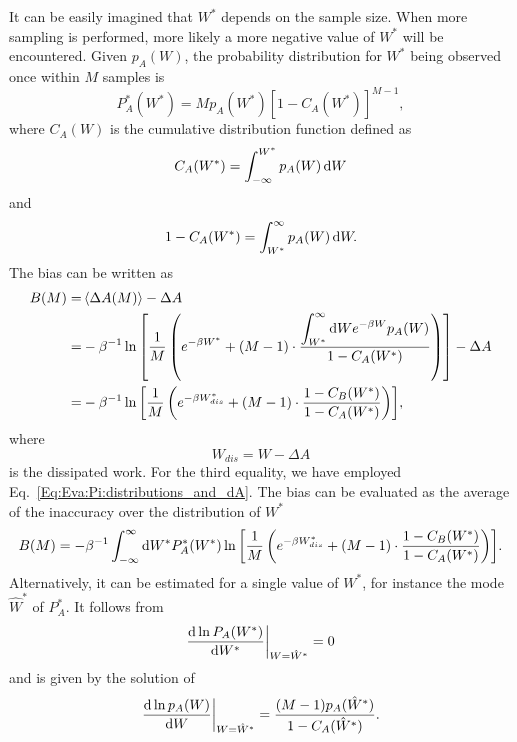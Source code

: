 It can be easily imagined that $W^\ast$ depends on the sample size. When more sampling is performed, more likely a more negative value of $W^\ast$ will be encountered. Given $p_A(W)$, the probability distribution for $W^\ast$ being observed once within $M$ samples is
\begin{equation}
    P_A^\ast(W^\ast)=Mp_A(W^\ast)[1-C_A(W^\ast)]^{M-1},
    \label{Eq:Eva:Pi:prob_of_Wstar}
\end{equation}
where $C_A(W)$ is the cumulative distribution function defined as
\begin{equation}
    C_A(W^\ast)=\int_{-\infty}^{W^\ast} p_A(W)\mathop{}\!\mathrm{d} W
\end{equation}
and
\begin{equation}
    1-C_A(W^\ast)=\int_{W^\ast}^{\infty} p_A(W)\mathop{}\!\mathrm{d} W.
\end{equation}
The bias can be written as
\begin{align}
    B(M)=&\left<\Delta A(M)\right>-\Delta A\notag\\
        =&-\beta^{-1}\ln{\left[\frac{1}{M}\left(e^{-\beta W^\ast}+(M-1)\cdot \frac{\displaystyle\int_{W^\ast}^{\infty}\mathop{}\!\mathrm{d}We^{-\beta W}p_A(W)}{1-C_A(W^\ast)}\right)\right]}-
        \Delta A\notag\\
        =&-\beta^{-1}\ln{\left[\frac{1}{M}\left(e^{-\beta W^\ast_{dis}}+(M-1)\cdot \frac{1-C_B(W^\ast)}{1-C_A(W^\ast)}\right)\right]},
        \label{Eq:Eva:Pi:bias}
\end{align}
where
\begin{equation}
    W_{dis}=W-\Delta A
\end{equation}
is the dissipated work. For the third equality, we have employed Eq.~\ref{Eq:Eva:Pi:distributions_and_dA}. The bias can be evaluated as the average of the inaccuracy over the distribution of $W^\ast$
\begin{equation}
    B(M)=-\beta^{-1}\int_{-\infty}^\infty\mathop{}\!\mathrm{d} W^\ast P_A^\ast(W^\ast)\ln{\left[\frac{1}{M}\left(e^{-\beta W^\ast_{dis}}+(M-1)\cdot \frac{1-C_B(W^\ast)}{1-C_A(W^\ast)}\right)\right]}.
\end{equation}
Alternatively, it can be estimated for a single value of $W^\ast$, for instance the mode $\hat{W}^\ast$ of $P_A^\ast$. It follows from  
\begin{equation}
    \frac{\mathop{}\!\mathrm{d} \ln{P_A(W^\ast)}}{\mathop{}\!\mathrm{d} W^\ast}\biggr\rvert_{W=\hat{W}^\ast}=0
\end{equation}
and is given by the solution of
\begin{equation}
    \frac{\mathop{}\!\mathrm{d} \ln{p_A(W)}}{\mathop{}\!\mathrm{d} W}\biggr\rvert_{W=\hat{W}^\ast}=\frac{(M-1)p_A(\hat{W}^\ast)}{1-C_A(\hat{W}^\ast)}.
    \label{Eq:Eva:Pi:Wmax}
\end{equation}
